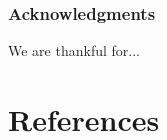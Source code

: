 \documentclass{article}
\begin{document}
\subsubsection*{Acknowledgments}

We are thankful for...

\section*{References}
\small




%
%
\end{document}
